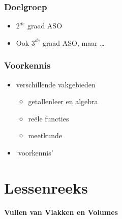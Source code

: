 \documentclass[dutch]{beamer}
\begin{document}
\begin{frame}
\begin{figure}[h]
\pause
{}
\end{figure}
\end{frame}



\begin{frame}
\frametitle{Doelgroep}
\pause
\begin{itemize}
\item $2^{de}$ graad ASO
\pause
\item Ook $3^{de}$ graad ASO\pause, maar \ldots
\end{itemize}
\end{frame}


\begin{frame}
\frametitle{Voorkennis}
\pause
\begin{itemize}
\item verschillende vakgebieden
\pause
\begin{itemize}
\item getallenleer en algebra
\item re\"{e}le functies
\item meetkunde
\end{itemize}
\pause
\item `voorkennis'
\end{itemize}
\end{frame}

\section{Lessenreeks}

\begin{frame}
\begin{center}
\textbf{\Large{Vullen van Vlakken en Volumes}}

\end{center}
\end{frame}
\end{document}
